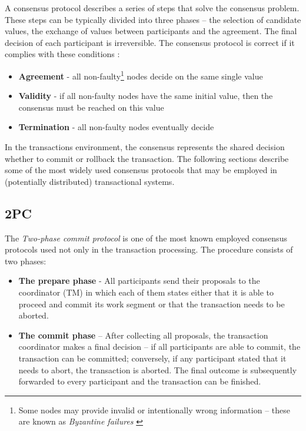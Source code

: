 \documentclass[oneside,
  digital, %
  table,   %
  lof,     %
  lot,     %
]{fithesis3}
\begin{document}
A consensus protocol describes a series of steps that solve the consensus problem. These steps can be typically divided into three phases -- the selection of candidate values, the exchange of values between participants and the agreement. The final decision of each participant is irreversible. The consensus protocol is correct if it complies with these conditions \cite{distributed-computing}:

\begin{itemize}
    \item \textbf{Agreement} - all non-faulty\footnote{Some nodes may provide invalid or intentionally wrong information -- these are known as \textit{Byzantine failures} \cite{byzantine-generals-problem}} nodes decide on the same single value
    
    \item \textbf{Validity} - if all non-faulty nodes have the same initial value, then the consensus must be reached on this value
    
    \item \textbf{Termination} - all non-faulty nodes eventually decide
\end{itemize}


In the transactions environment, the consensus represents the shared decision whether to commit or rollback the transaction. The following sections describe some of the most widely used consensus protocols that may be employed in (potentially distributed) transactional systems.

\subsection{2PC}

The \textit{Two-phase commit protocol} is one of the most known employed consensus protocols used not only in the transaction processing. The procedure consists of two phases:

\begin{itemize}
    \item \textbf{The prepare phase} - All participants send their proposals to the coordinator (TM) in which each of them states either that it is able to proceed and commit its work segment or that the transaction needs to be aborted.
    
    \item \textbf{The commit phase} -- After collecting all proposals, the transaction coordinator makes a final decision -- if all participants are able to commit, the transaction can be committed; conversely, if any participant stated that it needs to abort, the transaction is aborted. The final outcome is subsequently forwarded to every participant and the transaction can be finished.
\end{itemize}
\end{document}
